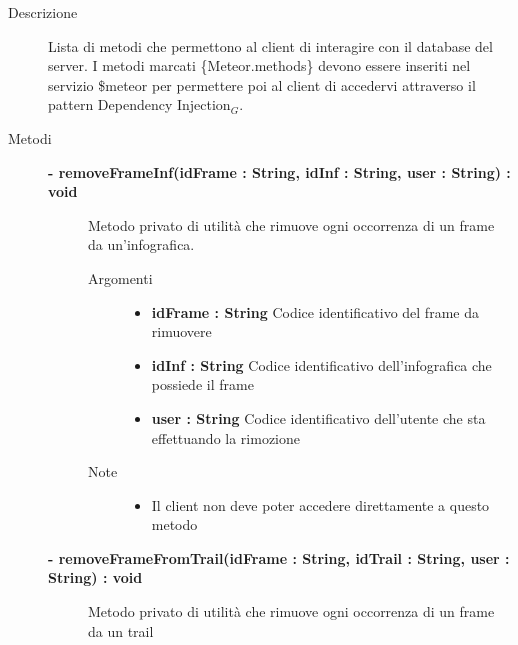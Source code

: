 \begin{description}
\item[Descrizione] \hfill
	Lista di metodi che permettono al client di interagire con il database del server. I metodi marcati \{Meteor.methods\} devono essere inseriti nel servizio \$meteor per permettere poi al client di accedervi attraverso il pattern Dependency Injection$_G$.\\






\item[Metodi] \hfill

	\begin{description}
		\item[\textbf{\color{blue}- removeFrameInf(idFrame : String, idInf : String, user : String) : void			}] \hfill
			Metodo privato di utilità che rimuove ogni occorrenza di un frame da un'infografica.
			
		\begin{description}
			\item[Argomenti] \hfill
				\begin{itemize}
				
					\item \textbf{idFrame : String			} \hfill
					Codice identificativo del frame da rimuovere
					\item \textbf{idInf : String		} \hfill
					Codice identificativo dell'infografica che possiede il frame
					\item \textbf{user : String			} \hfill
					Codice identificativo dell'utente che sta effettuando la rimozione
					
				\end{itemize}
			\item[Note] \hfill
			\begin{itemize}
					\item Il client non deve poter accedere direttamente a questo metodo
				\end{itemize}
		\end{description}
	\end{description}
	
	\begin{description}
		\item[\textbf{\color{blue}- removeFrameFromTrail(idFrame : String, idTrail : String, user :  String)	: void		}] \hfill
			Metodo privato di utilità che rimuove ogni occorrenza di un frame da un trail
			

\end{description}
\end{description}
